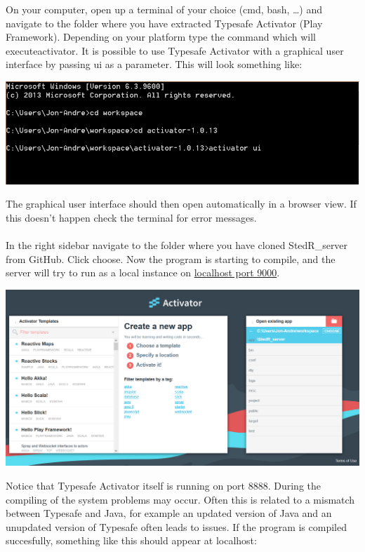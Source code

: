 \documentclass[11pt,a4paper,oneside]{article}
\begin{document}
On your computer, open up a terminal of your choice (cmd, bash, \dots) and navigate to the folder where you have extracted Typesafe Activator (Play Framework). Depending on your platform type the command which will executeactivator. It is possible to use Typesafe Activator with a graphical user interface by passing ui as a parameter. This will look something like:
\begin{center}
\includegraphics[scale=0.8]{guide/activator1.png} 
\end{center}
The graphical user interface should then open automatically in a browser view. If this doesn't happen check the terminal for error messages.

\paragraph{}
In the right sidebar navigate to the folder where you have cloned StedR\_server from GitHub. Click choose. Now the program is starting to compile, and the server will try to run as a local instance on \href{http://127.0.0.1:9000}{localhost port 9000}. 
\begin{center}
\includegraphics[scale=0.4]{guide/activator2.png} 
\end{center}

Notice that Typesafe Activator itself is running on port 8888. During the compiling of the system problems may occur. Often this is related to a mismatch between Typesafe and Java, for example an updated version of Java and an unupdated version of Typesafe often leads to issues. If the program is compiled succesfully, something like this should appear at localhost: 
\end{document}
